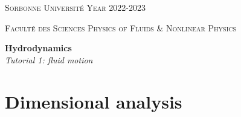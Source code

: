 \documentclass[11pt,a4paper]{article}
\begin{document}
\setlength{\unitlength}{1cm}
\noindent
\parbox{\textwidth}{
\textsc{
Sorbonne Université  
\hfill
Year 2022-2023
}
}
\parbox{\textwidth}{
\textsc{
Faculté des Sciences
\hfill
Physics of Fluids \& Nonlinear Physics
}
}

\begin{center}
\Large
\textbf{Hydrodynamics} \\ 
\textsl{Tutorial 1: fluid motion} \\[1ex]
\end{center}

\section{Dimensional analysis}
\togglefalse{corrige}
\end{document}
